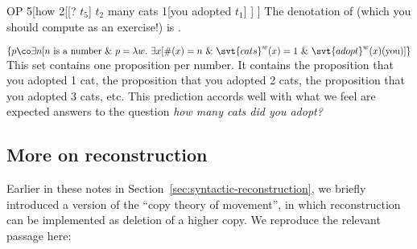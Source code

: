 \ex OP 5[how 2[[? $t_{5}$] $t_{2}$ many cats 1[you adopted $t_{1}$] ] ] \xe
%
The denotation of \Last (which you should compute as an exercise!) is \Next.

\ex $\{p\co \exists n [n\ \text{is a
  number}\ \&\ p = \lambda w.\ \exists x [\#(x)=n\ \&\ \svt{cats}^{w}(x)=1\ \&\
\svt{adopt}^{w}(x)(\text{you})]\}$
\xe
%
This set contains one proposition per number. It contains the proposition that
you adopted 1 cat, the proposition that you adopted 2 cats, the proposition that
you adopted 3 cats, etc. This prediction accords well with what we feel are
expected answers to the question \emph{how many cats did you adopt?}

\subsection{More on reconstruction}
\label{sec:more-reconstruction}

Earlier in these notes in Section~\ref{sec:syntactic-reconstruction}, we briefly
introduced a version of the ``copy theory of movement'', in which reconstruction
can be implemented as deletion of a higher copy. We reproduce the relevant
passage here:

